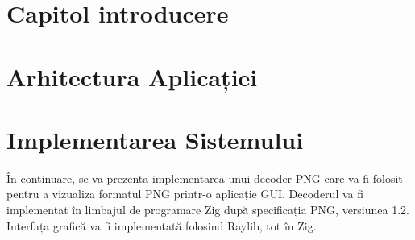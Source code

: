 \documentclass[a4paper,12pt]{report}
\begin{document}
\chapter{Capitol introducere}\label{intro_chapter_title}



\chapter{Arhitectura Aplicației}\label{architecture_chapter_title}



\chapter{Implementarea Sistemului}\label{implementation_chapter_title}

În continuare, se va prezenta implementarea unui decoder PNG care va fi folosit
pentru a vizualiza formatul PNG printr-o aplicație \ac{GUI}. 
Decoderul va fi implementat în limbajul de programare Zig\cite{zig} după specificația \ac{PNG}, versiunea 1.2\cite{png_spec}.
Interfața grafică va fi implementată folosind Raylib\cite{raylib}, tot în Zig.
\end{document}
